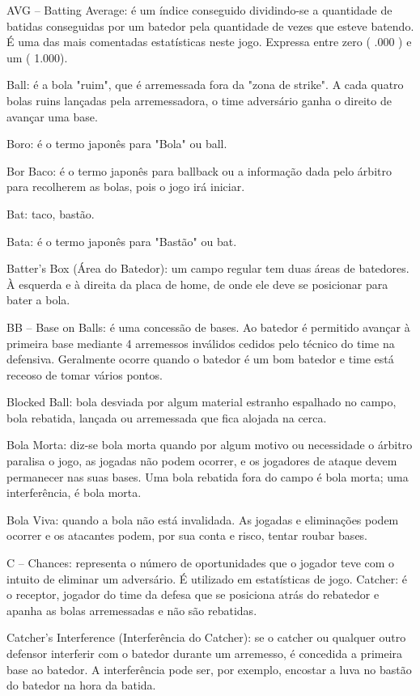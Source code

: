  AVG -- Batting Average: é um índice conseguido dividindo-se a quantidade de batidas conseguidas por um batedor pela quantidade de vezes que esteve batendo. É uma das mais comentadas estatísticas neste jogo. Expressa entre zero ( .000 ) e um ( 1.000).

 Ball: é a bola "ruim", que é arremessada fora da "zona de strike". A cada quatro bolas ruins lançadas pela arremessadora, o time adversário ganha o direito de avançar uma base.

 Boro: é o termo japonês para "Bola" ou \gls{ball}.

 Bor Baco: é o termo japonês para \gls{ballback} ou a informação dada pelo árbitro para recolherem as bolas, pois o jogo irá iniciar.

 Bat: taco, bastão.

 Bata: é o termo japonês para "Bastão" ou \gls{bat}.

 Batter's Box (Área do Batedor): um campo regular tem duas áreas de batedores. À esquerda e à direita da placa de home, de onde ele deve se posicionar para bater a bola.

 BB -- Base on Balls: é uma concessão de bases. Ao batedor é permitido avançar à primeira base mediante 4 arremessos inválidos cedidos pelo técnico do time na defensiva. Geralmente ocorre quando o batedor é um bom batedor e time está receoso de tomar vários pontos.

 Blocked Ball: bola desviada por algum material estranho espalhado no campo, bola rebatida, lançada ou arremessada que fica alojada na cerca.

 Bola Morta: diz-se bola morta quando por algum motivo ou necessidade o árbitro paralisa o jogo, as jogadas não podem ocorrer, e os jogadores de ataque devem permanecer nas suas bases. Uma bola rebatida fora do campo é bola morta; uma interferência, é bola morta.

 Bola Viva: quando a bola não está invalidada. As jogadas e eliminações podem ocorrer e os atacantes podem, por sua conta e risco, tentar roubar bases.

 C -- Chances: representa o número de oportunidades que o jogador teve com o intuito de eliminar um adversário. É utilizado em estatísticas de jogo.
 Catcher: é o receptor, jogador do time da defesa que se posiciona atrás do rebatedor e apanha as bolas arremessadas e não são rebatidas.

 Catcher's Interference (Interferência do Catcher): se o catcher ou qualquer outro defensor interferir com o batedor durante um arremesso, é concedida a primeira base ao batedor. A interferência pode ser, por exemplo, encostar a luva no bastão do batedor na hora da batida.

